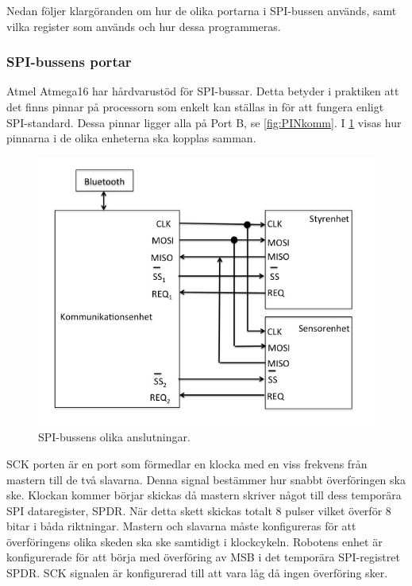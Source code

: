 Nedan följer klargöranden om hur de olika portarna i SPI-bussen används, samt vilka register som används och hur dessa programmeras. 

\subsubsection{SPI-bussens portar}

Atmel Atmega16 har hårdvarustöd för SPI-bussar. Detta betyder i praktiken att det finns pinnar på processorn som enkelt kan ställas in för att fungera enligt SPI-standard. Dessa pinnar ligger alla på Port B, se \ref{fig:PINkomm}. I \ref{fig:spibuss} visas hur pinnarna i de olika enheterna ska kopplas samman.

\begin{figure}[H]
  \centering
 \includegraphics[angle=0,scale=0.5]{bilder/SPI-buss.png}
  \caption{SPI-bussens olika anslutningar. }
  \label{fig:spibuss}
\end{figure}



SCK porten är en port som förmedlar en klocka med en viss frekvens från mastern till de två slavarna. Denna signal bestämmer hur snabbt överföringen ska ske. Klockan kommer börjar skickas då mastern skriver något till dess temporära SPI dataregister, SPDR. När detta skett skickas totalt 8 pulser vilket överför 8 bitar i båda riktningar. Mastern och slavarna måste konfigureras för att överföringens olika skeden ska ske samtidigt i klockcykeln. Robotens enhet är konfigurerade för att börja med överföring av MSB i det temporära SPI-registret SPDR. SCK signalen är konfigurerad till att vara låg då ingen överföring sker.

